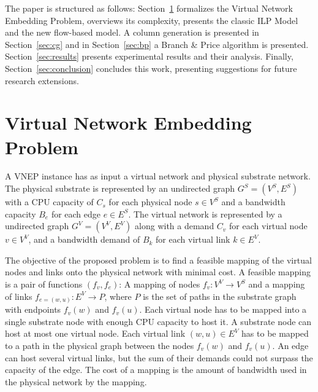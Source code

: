 \documentclass[conference]{IEEEtran}
\begin{document}

The paper is structured as follows: Section~\ref{sec:prob} formalizes the Virtual Network Embedding Problem, overviews its complexity, presents the classic ILP Model and the new flow-based model. A column generation is presented in Section~\ref{sec:cg} and in Section~\ref{sec:bp} a Branch \& Price algorithm is presented.
Section~\ref{sec:results} presents experimental results and their analysis. Finally, Section~\ref{sec:conclusion} concludes this work, presenting suggestions for future research extensions.


\section{Virtual Network Embedding Problem}
\label{sec:prob}
A VNEP instance has as input a virtual network and physical substrate network. The physical substrate is represented by an undirected graph $G^S = (V^S,E^S)$ with a CPU capacity of $C_{s}$ for each physical node $s \in V^S$ and a bandwidth capacity $B_{e}$ for each edge $e \in E^S$. The virtual network is represented by a undirected graph $G^V = (V^V,E^V)$ along with a demand $C_{v}$ for each virtual node $v \in V^V$, and a bandwidth demand of $B_{k}$ for each virtual link $k \in E^V$. 

The objective of the proposed problem is to find a feasible mapping of the virtual nodes and links onto the physical network with minimal cost. 
A feasible mapping is a pair of functions $(f_v, f_e)$: A mapping of nodes $f_v: V^V \rightarrow V^S$ and a mapping of links $f_{e=(w,u)}: E^V \rightarrow P$, where $P$ is the set of paths in the substrate graph with endpoints $f_v(w)$ and $f_v(u)$.
Each virtual node has to be mapped into a single substrate node with enough CPU capacity to host it. A substrate node can host at most one virtual node. Each virtual link $(w,u) \in E^V$ has to be mapped to a path in the physical graph between the nodes $f_v(w)$ and $f_v(u)$. An edge can host several virtual links, but the sum of their demands could not surpass the capacity of the edge. The cost of a mapping is the amount of bandwidth used in the physical network by the mapping.
\end{document}
